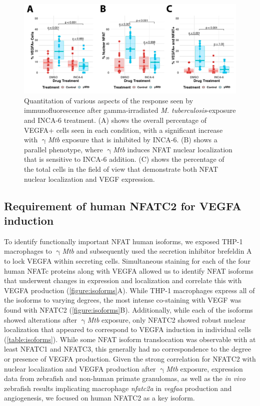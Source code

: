 \begin{figure}
\centering
\includegraphics[width=\textwidth]{images/incaIFquant.pdf}
\caption{Quantitation of various aspects of the response seen by immunofluorescence after gamma-irradiated \textit{M. tuberculosis}-exposure and INCA-6 treatment. (A) shows the overall percentage of VEGFA+ cells seen in each condition, with a significant increase with $\upgamma$\textit{Mtb} exposure that is inhibited by INCA-6. (B) shows a parallel phenotype, where $\upgamma$\textit{Mtb} induces NFAT nuclear localization that is sensitive to INCA-6 addition. (C) shows the percentage of the total cells in the field of view that demonstrate both NFAT nuclear localization and VEGF expression.}
\label{figure:incaquant}

\end{figure}

\subsection{Requirement of human NFATC2 for VEGFA induction}\label{thp1lenti}

To identify functionally important NFAT human isoforms, we exposed THP-1 macrophages to $\upgamma$\textit{Mtb} and subsequently used the secretion inhibitor brefeldin A to lock VEGFA within secreting cells. Simultaneous staining for each of the four human NFATc proteins along with VEGFA allowed us to identify NFAT isoforms that underwent changes in expression and localization and correlate this with VEGFA production (\autoref{figure:isoforms}A). While THP-1 macrophages express all of the isoforms to varying degrees, the most intense co-staining with VEGF was found with NFATC2 (\autoref{figure:isoforms}B). Additionally, while each of the isoforms showed alterations after $\upgamma$\textit{Mtb} exposure, only NFATC2 showed robust nuclear localization that appeared to correspond to VEGFA induction in individual cells (\autoref{table:isoforms}). While some NFAT isoform translocation was observable with at least NFATC1 and NFATC3, this generally had no correspondence to the degree or presence of VEGFA production. Given the strong correlation for NFATC2 with nuclear localization and VEGFA production after $\upgamma$\textit{Mtb} exposure, expression data from zebrafish and non-human primate granulomas, as well as the \textit{in vivo} zebrafish results implicating macrophage \textit{nfatc2a} in \textit{vegfaa} production and angiogenesis, we focused on human NFATC2 as a key isoform.

